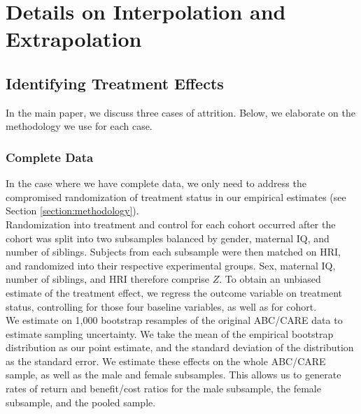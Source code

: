 \section{Details on Interpolation and Extrapolation} \label{appendix:methodology}

\subsection{Identifying Treatment Effects}
\label{app:method_identify}

\noindent In the main paper, we discuss three cases of attrition. Below, we elaborate on the methodology we use for each case. \\

\subsubsection{Complete Data}
\label{app:method_fullobs}

\noindent  In the case where we have complete data, we only need to address the compromised randomization
of treatment status in our empirical estimates (see Section \ref{section:methodology}). \\

\noindent Randomization into treatment and control for each cohort occurred after the cohort was split
into two subsamples balanced by gender, maternal IQ,
and number of siblings. Subjects from each subsample were then matched on HRI, and randomized
into their respective experimental groups. Sex, maternal IQ, number of siblings, and HRI
therefore comprise $Z$. To obtain an
unbiased estimate of the treatment effect, we regress the outcome variable on treatment status,
controlling for those four baseline variables, as well as for cohort. \\

\noindent We estimate on 1,000 bootstrap resamples of the original ABC/CARE data to estimate sampling uncertainty. We take the mean of the empirical bootstrap distribution as our point estimate, and the standard deviation
of the distribution as the standard error. We estimate these effects on the
whole ABC/CARE sample, as well as the male and female subsamples. This allows us to generate
rates of return and benefit/cost ratios for the male subsample, the female subsample, and the pooled sample. \\


